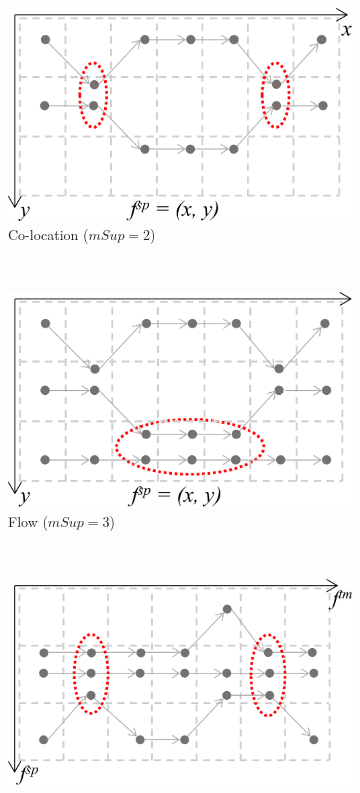 \documentclass[
]{ceurart}
\begin{document}
\begin{figure}[t]
    \begin{subfigure}[t]{.5\columnwidth}
        \centering
        \includegraphics[scale=.18]{colocation.pdf}
        \caption{Co-location ($mSup=2$)}
        \label{fig:colocation}
    \end{subfigure}~
    \begin{subfigure}[t]{.5\columnwidth}
        \centering
        \includegraphics[scale=.18]{flow.pdf}
        \caption{Flow ($mSup=3$)}
        \label{fig:flow}
    \end{subfigure}
    \\
    \begin{subfigure}[t]{.53\columnwidth}
        \centering
        \includegraphics[scale=.18]{swarm.pdf}

\end{subfigure}
\end{figure}
\end{document}
